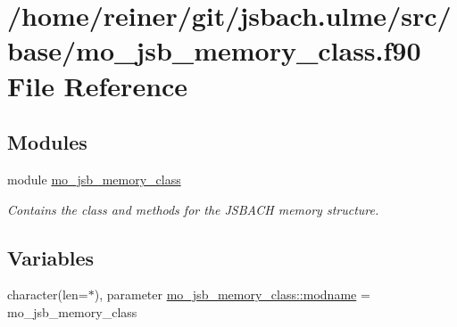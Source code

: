 \hypertarget{mo__jsb__memory__class_8f90}{}\section{/home/reiner/git/jsbach.ulme/src/base/mo\+\_\+jsb\+\_\+memory\+\_\+class.f90 File Reference}
\label{mo__jsb__memory__class_8f90}
\subsection*{Modules}
\begin{DoxyCompactItemize}
\item 
module \hyperlink{namespacemo__jsb__memory__class}{mo\+\_\+jsb\+\_\+memory\+\_\+class}
\begin{DoxyCompactList}\small\item\em Contains the class and methods for the J\+S\+B\+A\+C\+H memory structure. \end{DoxyCompactList}\end{DoxyCompactItemize}
\subsection*{Variables}
\begin{DoxyCompactItemize}
\item 
character(len=$\ast$), parameter \hyperlink{namespacemo__jsb__memory__class_a5f730dd2ee4741a6cca3a223fa21abaa}{mo\+\_\+jsb\+\_\+memory\+\_\+class\+::modname} = \textquotesingle{}mo\+\_\+jsb\+\_\+memory\+\_\+class\textquotesingle{}
\end{DoxyCompactItemize}
